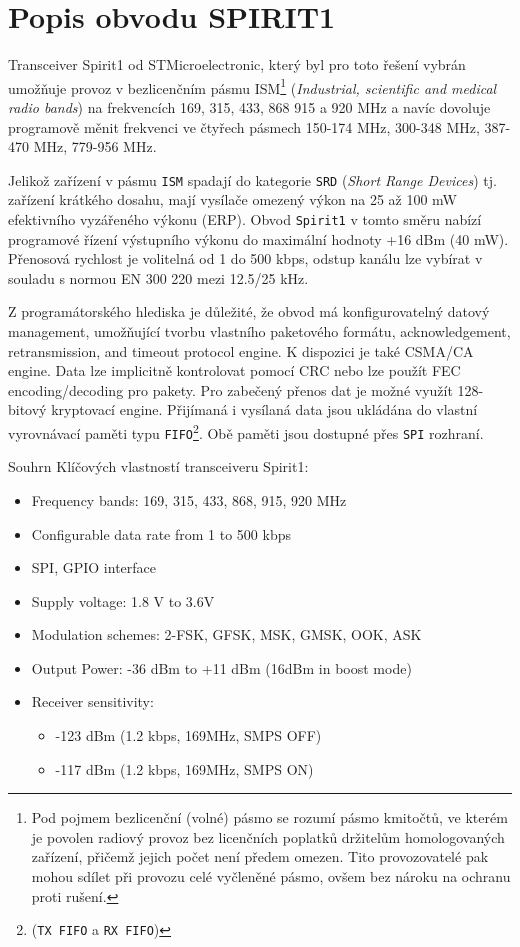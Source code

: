   \section{Popis obvodu SPIRIT1}
    Transceiver Spirit1 od STMicroelectronic, který byl pro toto řešení vybrán umožňuje provoz v 
    bezlicenčním pásmu ISM\footnote{Pod pojmem bezlicenční (volné) pásmo se rozumí pásmo kmitočtů, 
    ve kterém je povolen radiový provoz bez licenčních poplatků držitelům homologovaných zařízení, 
    přičemž jejich počet není předem omezen. Tito provozovatelé pak mohou sdílet při provozu celé 
    vyčleněné pásmo, ovšem bez nároku na ochranu proti rušení.} (\emph{Industrial, scientific and 
    medical radio bands}) na frekvencích 169, 315, 433, 868 915 a 920 MHz a navíc dovoluje 
    programově měnit frekvenci ve čtyřech pásmech 150-174 MHz, 300-348 MHz, 387-470 MHz, 779-956 
    MHz. %
    
    Jelikož zařízení v pásmu \texttt{ISM} spadají do kategorie \texttt{SRD} (\emph{Short Range 
    Devices}) tj. zařízení krátkého dosahu, mají vysílače omezený výkon na 25 až 100 mW efektivního 
    vyzářeného výkonu (ERP). Obvod \texttt{Spirit1} v tomto směru nabízí programové řízení 
    výstupního výkonu do maximální hodnoty +16 dBm (40 mW). Přenosová rychlost je volitelná od 1 do 
    500 kbps, odstup kanálu lze vybírat v souladu s normou EN 300 220 mezi 12.5/25 kHz.
    
    Z programátorského hlediska je důležité, že obvod má konfigurovatelný datový management, 
    umožňující tvorbu vlastního paketového formátu, acknowledgement, retransmission, and timeout 
    protocol engine. K dispozici je také CSMA/CA engine. Data lze implicitně kontrolovat pomocí CRC 
    nebo lze  použít FEC encoding/decoding pro pakety. Pro zabečený přenos dat je možné využít 
    128-bitový kryptovací engine. Přijímaná i vysílaná data jsou ukládána do vlastní vyrovnávací 
    paměti typu \texttt{FIFO}\footnote{(\texttt{TX FIFO} a \texttt{RX FIFO})}. Obě paměti jsou  
    dostupné přes \texttt{SPI} rozhraní.

    Souhrn Klíčových vlastností transceiveru Spirit1:
      \begin{itemize}\addtolength{\itemsep}{-0.5\baselineskip}
        \item Frequency bands: 169, 315, 433, 868, 915, 920 MHz
        \item Configurable data rate from 1 to 500 kbps
        \item SPI, GPIO interface
        \item Supply voltage: 1.8 V to 3.6V
        \item Modulation schemes: 2-FSK, GFSK, MSK, GMSK, OOK, ASK  
        \item Output Power: -36 dBm to +11 dBm (16dBm in boost mode)
        \item Receiver sensitivity: 
          \begin{itemize}
            \item -123 dBm (1.2 kbps, 169MHz, SMPS OFF)
            \item -117 dBm (1.2 kbps, 169MHz, SMPS ON)
          \end{itemize}  
      \end{itemize}
    
